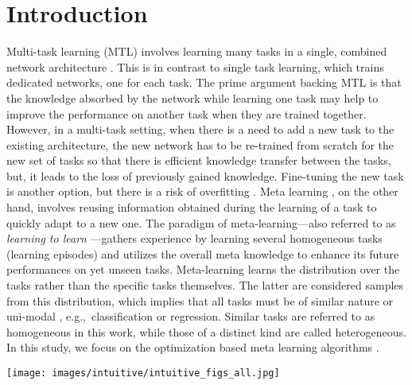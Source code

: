 \documentclass[conference]{IEEEtran}
\newcommand*{\eg}		{e.g.,\ }
\begin{document}
\section{Introduction}
\label{sec:intro}
Multi-task learning (\ac{MTL}) involves learning many tasks in a single, combined network architecture \cite{MTL_rich}. This is in contrast to single task learning, which trains dedicated networks, one for each task.
The prime argument backing \ac{MTL} is that the knowledge absorbed by the network while learning one task may help to improve the performance on another task when they are trained together. 
However, in a multi-task setting, when there is a need to add a new task to the existing architecture, the new network has to be re-trained from scratch for the new set of tasks so that there is efficient knowledge transfer between the tasks, but, it leads to the loss of previously gained knowledge.
Fine-tuning the new task is another option, but there is a risk of overfitting \cite{overfitting}.
Meta learning \cite{hospedales2020meta, pmlr-v70-finn17a}, on the other hand, involves reusing information obtained during the learning of a task to quickly adapt to a new one.
The paradigm of meta-learning---also referred to as \emph{learning to learn} \cite{Thrun1998}---gathers experience by learning several homogeneous tasks (learning episodes) and utilizes the overall meta knowledge to enhance its future performances on yet unseen tasks. 
Meta-learning learns the distribution over the tasks rather than the specific tasks themselves. 
The latter are considered samples from this distribution, which implies that all tasks must be of similar nature or uni-modal \cite{hospedales2020meta}, \eg classification or regression. 
Similar tasks are referred to as homogeneous in this work, while those of a distinct kind are called heterogeneous.
In this study, we focus on the optimization based meta learning algorithms \cite{pmlr-v70-finn17a, Ravi2017OptimizationAA, reptile, meta_sgd,lee2018gradient}.
\begin{figure*}[t]
    \centering
    \texttt{[image: images/intuitive/intuitive\_figs\_all.jpg]}
    \vspace{-2em}
    \label{fig:simple_fig}    
\end{figure*}
\end{document}
